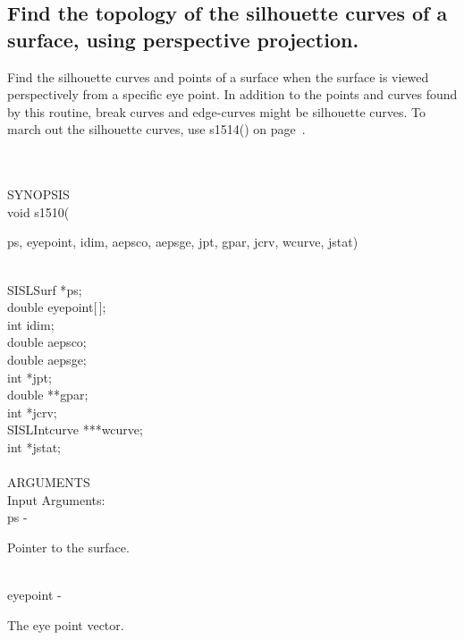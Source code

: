 \subsection{Find the topology of the silhouette curves of a surface,
 using perspective projection.}
\begin{minipg1}
  Find the silhouette curves and points of a surface when
  the surface is viewed perspectively from a specific eye point.
  In addition to the points and curves found by this routine,
  break curves and edge-curves might be silhouette curves.
  To march out the silhouette curves, use s1514() on page~\pageref{s1514}.
\end{minipg1} \\ \\
SYNOPSIS\\
        \>void s1510(\begin{minipg3}
          {\fov ps}, {\fov eyepoint}, {\fov idim},  {\fov aepsco},  {\fov aepsge},  {\fov jpt},  {\fov gpar},  {\fov jcrv},  {\fov wcurve},  {\fov jstat})
        \end{minipg3}\\[0.3ex]
        \>\>    SISLSurf \> *{\fov ps};\\
        \>\>    double   \> {\fov eyepoint}[\,];\\
        \>\>    int      \> {\fov idim};\\
        \>\>    double   \> {\fov aepsco};\\
        \>\>    double   \> {\fov aepsge};\\
        \>\>    int      \> *{\fov jpt};\\
        \>\>    double   \> **{\fov gpar};\\
        \>\>    int      \> *{\fov jcrv};\\
        \>\>    SISLIntcurve \> ***{\fov wcurve};\\
        \>\>    int      \> *{\fov jstat};\\
\\
ARGUMENTS\\
        \>Input Arguments:\\
        \>\>    {\fov ps}\> - \>  \begin{minipg2}
                           Pointer to the surface.
                               \end{minipg2}\\
        \>\>    {\fov eyepoint}\> - \>  \begin{minipg2}
                      The eye point vector.
                               \end{minipg2}\\
